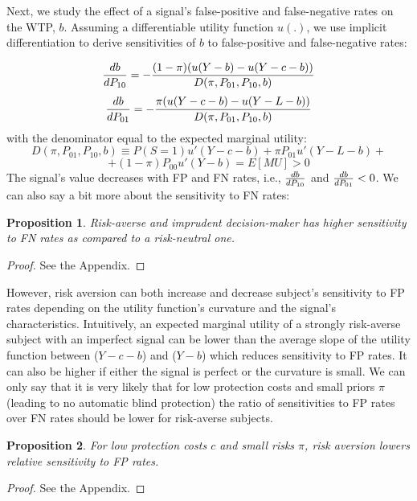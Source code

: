 \documentclass[12pt,a4paper]{article}
\newtheorem{theorem}{Proposition}
\begin{document}
Next, we study the effect of a signal's false-positive and false-negative rates on the WTP, $b$. Assuming a differentiable utility function $u(.)$, we use implicit differentiation to derive sensitivities of $b$ to false-positive and false-negative rates:

$${db\over dP_{10}}=-{(1-\pi)(u(Y-b)-u(Y-c-b))\over D(\pi, P_{01}, P_{10}, b)}$$
$${db\over dP_{01}}=-{\pi(u(Y-c-b)-u(Y-L-b))\over D(\pi, P_{01}, P_{10}, b)}$$
with the denominator equal to the expected marginal utility:
$$D(\pi, P_{01}, P_{10}, b)\equiv P(S=1)u'(Y-c-b)+\pi P_{01}u'(Y-L-b)+$$
$$+(1-\pi)P_{00}u'(Y-b)=E[MU]>0$$
The signal's value decreases with FP and FN rates, i.e., ${db\over dP_{10}}$ and ${db\over dP_{01}}<0$. We can also say a bit more about the sensitivity to FN rates:
\begin{theorem}
Risk-averse and imprudent decision-maker has higher sensitivity to FN rates as compared to a risk-neutral one.
\end{theorem}\label{thm:riskAverse}  
\begin{proof}
See the Appendix.
\end{proof}

However, risk aversion can both increase and decrease subject's sensitivity to FP rates depending on the utility function's curvature and the signal's characteristics. Intuitively, an expected marginal utility of a strongly risk-averse subject with an imperfect signal can be lower than the average slope of the utility function between ($Y-c-b$) and ($Y-b$) which reduces sensitivity to FP rates. It can also be higher if either the signal is perfect or the curvature is small. We can only say that it is very likely that for low protection costs and small priors $\pi$ (leading to no automatic blind protection) the ratio of sensitivities to FP rates over FN rates should be lower for risk-averse subjects. 

\begin{theorem}
For low protection costs $c$ and small risks $\pi$, risk aversion lowers relative sensitivity to FP rates. 
\end{theorem}\label{thm:riskAverse2}  

\begin{proof}
See the Appendix.
\end{proof}
\end{document}
